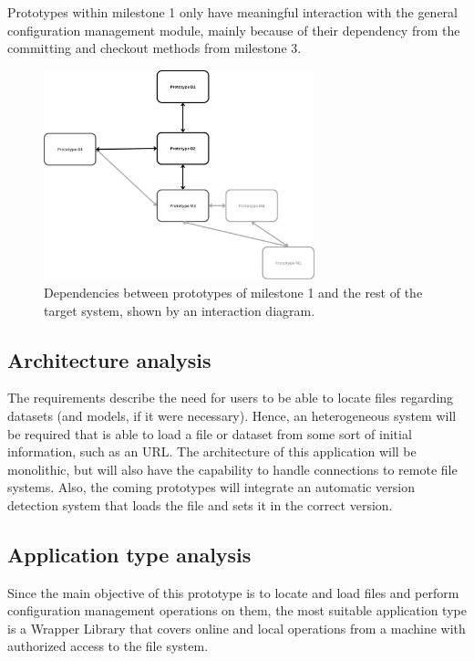 Prototypes within milestone 1 only have meaningful interaction with the general configuration management module, mainly because of their dependency from the committing and
checkout methods from milestone 3. 

\begin{figure}[H]
    \centering
    \includegraphics[width=0.7\textwidth]{figs/D-dependencies.png}
    \caption{Dependencies between prototypes of milestone 1 and the rest of the target system, shown by an interaction diagram.}
\end{figure}

\subsection{Architecture analysis}

The requirements describe the need for users to be able to locate files regarding datasets (and models, if it were necessary). Hence, an heterogeneous system will be 
required that is able to load a file or dataset from some sort of initial information, such as an URL. The architecture of this application will be monolithic, but will 
also have the capability to handle connections to remote file systems. Also, the coming prototypes will integrate an automatic version detection system that loads the file and 
sets it in the correct version.

\subsection{Application type analysis}

Since the main objective of this prototype is to locate and load files and perform configuration management operations on them, the most suitable application type is a Wrapper Library 
that covers online and local operations from a machine with authorized access to the file system.

